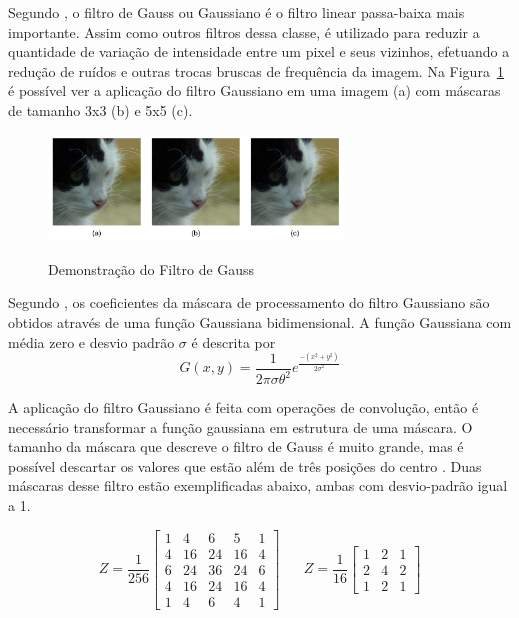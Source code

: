 \documentclass[12pt,oneside,a4paper,english,french,spanish,brazil,]{abntex2}
\begin{document}
Segundo \citet{conci:2003}, o filtro de Gauss ou Gaussiano é o filtro linear passa-baixa mais importante. Assim como outros filtros dessa classe, é utilizado para reduzir a quantidade de variação de intensidade entre um pixel e seus vizinhos, efetuando a redução de ruídos e outras trocas bruscas de frequência da imagem. Na Figura~\ref{fig:PDI_Gauss} é possível ver a aplicação do filtro Gaussiano em uma imagem (a) com máscaras de tamanho 3x3 (b) e 5x5 (c).

\begin{figure}[ht]
\centering
\caption{Demonstração do Filtro de Gauss}
\includegraphics[width=0.7\textwidth]{imagens/PDI_Gauss.pdf}
\sourceAuthor
\label{fig:PDI_Gauss}
\end{figure}

Segundo \citet{pedrini:2008}, os coeficientes da máscara de processamento do filtro Gaussiano são obtidos através de uma função Gaussiana bidimensional. A função Gaussiana com média zero e desvio padrão \(\sigma\) é descrita por \[G(x,y)=\frac{1}{2\pi\sigma\theta^2} e^{\frac{-(x^2+y^2)}{2\sigma^2}  }\]

A aplicação do filtro Gaussiano é feita com operações de convolução, então é necessário transformar a função gaussiana em estrutura de uma máscara. O tamanho da máscara que descreve o filtro de Gauss é muito grande, mas é possível descartar os valores que estão além de três posições do centro \cite{conci:2003}. Duas máscaras desse filtro estão exemplificadas abaixo, ambas com desvio-padrão igual a 1.

\[Z=\frac{1}{256}\begin{bmatrix}
1 & 4 & 6 & 5 & 1\\ 
4 & 16 & 24 & 16 & 4\\ 
6 & 24 & 36 & 24 & 6\\ 
4 & 16 & 24 & 16 & 4\\ 
1 & 4 & 6 & 4 & 1
\end{bmatrix}
\; \; \; \; \; \; 
Z=\frac{1}{16}\begin{bmatrix}
1 & 2 & 1\\ 
2 & 4 & 2\\ 
1 & 2 & 1
\end{bmatrix}
\]
\end{document}
